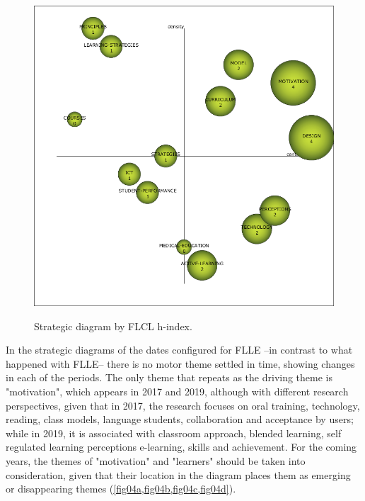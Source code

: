 \documentclass{textolivre-html}
\begin{document}
\begin{figure}[htbp]\ContinuedFloat
 \begin{minipage}{.45\textwidth}
 \includegraphics[width=\textwidth]{Fig03g.png}
 \label{fig03g}
 \end{minipage}
 \hfill
 \begin{minipage}{.45\textwidth}
  \hfill
 \end{minipage}
 \caption{Strategic diagram by FLCL h-index.}
 \label{fig03}
\end{figure}

In the strategic diagrams of the dates configured for FLLE –in contrast to what happened with FLLE– there is no motor theme settled in time, showing changes in each of the periods. The only theme that repeats as the driving theme is "motivation", which appears in 2017 and 2019, although with different research perspectives, given that in 2017, the research focuses on oral training, technology, reading, class models, language students, collaboration and acceptance by users; while in 2019, it is associated with classroom approach, blended learning, self regulated learning perceptions e-learning, skills and achievement. For the coming years, the themes of "motivation" and "learners" should be taken into consideration, given that their location in the diagram places them as emerging or disappearing themes (\cref{fig04a,fig04b,fig04c,fig04d}).
\end{document}
